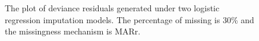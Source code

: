 \documentclass[12pt, fullpage, a4paper]{article}
\begin{document}
\begin{figure}[ht!]
	\begin{center}
	\end{center}
	\caption{The plot of deviance residuals generated  under two logistic regression imputation models. The percentage of missing is 30\% and the missingness mechanism is MARr.}
	\label{fig9}
\end{figure}
\end{document}
